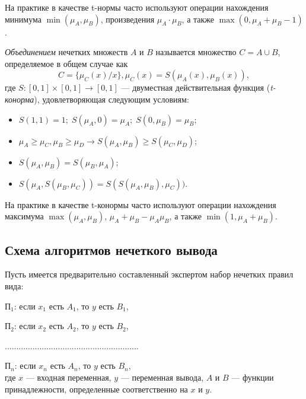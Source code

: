 На практике в качестве t-нормы часто используют операции
нахождения минимума \( \min(\mu_A, \mu_B ) \),
произведения \( \mu_A \cdot \mu_B \), а также
\( \max(0, \mu_A + \mu_B - 1) \).

\emph{Объединением} нечетких множеств \( A \) и \( B \) называется множество
\( C = A \cup B \), определяемое в общем случае как
\[ C = \{ \mu_C(x) / x \}, \mu_C(x) = S(\mu_A(x), \mu_B(x)), \]
где \( S: [0, 1] \times [0,1] \rightarrow [0, 1] \) ---
двуместная действительная функция (\emph{t-конорма}),
удовлетворяющая следующим условиям:
\begin{itemize}
\item \( S(1, 1) = 1; \; S(\mu_A, 0) = \mu_A; \; S(0, \mu_B) = \mu_B \);
\item \( \mu_A \ge \mu_C, \mu_B \ge \mu_D \rightarrow S(\mu_A, \mu_B) \ge S(\mu_C, \mu_D) \);
\item \( S(\mu_A, \mu_B) = S(\mu_B, \mu_A) \);
\item \( S(\mu_A, S(\mu_B, \mu_C)) = S(S(\mu_A, \mu_B), \mu_C)) \).
\end{itemize}

На практике в качестве t-конормы часто используют операции
нахождения максимума \( \max(\mu_A, \mu_B ) \),
\( \mu_A + \mu_B - \mu_A \mu_B \), а также
\( \min(1, \mu_A + \mu_B) \).

\pagebreak

\subsection{Схема алгоритмов нечеткого вывода}

Пусть имеется предварительно составленный экспертом набор нечетких правил вида: \par
\( \text{П}_1 \): если \( x_1 \) есть \( A_1 \), то \( y \) есть \( B_1 \), \par
\( \text{П}_2 \): если \( x_2 \) есть \( A_2 \), то \( y \) есть \( B_2 \), \par
..........................................................  \par
\( \text{П}_n \): если \( x_n \) есть \( A_n \), то \( y \) есть \( B_n \), \\
где \( x \) --- входная переменная,
\( y \) --- переменная вывода,
\( A \) и \( B \) --- функции принадлежности,
определенные соответственно на \( x \) и \( y \).

